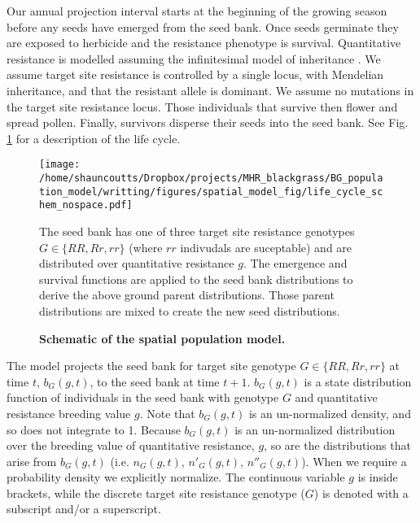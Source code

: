 \documentclass[10pt,letterpaper]{article}
\begin{document}
Our annual projection interval starts at the beginning of the growing season before any seeds have emerged from the seed bank. Once seeds germinate they are exposed to herbicide and the resistance phenotype is survival.  Quantitative resistance is modelled assuming the infinitesimal model of inheritance \cite{Fish1918}. We assume target site resistance is controlled by a single locus, with Mendelian inheritance, and that the resistant allele is dominant. We assume no mutations in the target site resistance locus. Those individuals that survive then flower and spread pollen. Finally, survivors disperse their seeds into the seed bank. See Fig. \ref{fig:schematic} for a description of the life cycle.  

\begin{figure}[!h]
	\centering
	\texttt{[image: /home/shauncoutts/Dropbox/projects/MHR\_blackgrass/BG\_population\_model/writting/figures/spatial\_model\_fig/life\_cycle\_schem\_nospace.pdf]}
\caption{\bf Schematic of the spatial population model.} The seed bank has one of three target site resistance genotypes $G \in \{RR, Rr, rr\}$ (where $rr$ indivudals are suceptable) and are distributed over quantitative resistance $g$. The emergence and survival functions are applied to the seed bank distributions to derive the above ground parent distributions. Those parent distributions are mixed to create the new seed distributions. \label{fig:schematic}
\end{figure}

The model projects the seed bank for target site genotype $G \in \{RR, Rr, rr\}$ at time $t$, $b_G(g, t)$, to the seed bank at time $t+1$. $b_G(g, t)$ is a state distribution function of individuals in the seed bank with genotype $G$ and quantitative resistance breeding value $g$. Note that $b_G(g, t)$ is an un-normalized density, and so does not integrate to 1. Because $b_G(g, t)$ is an un-normalized distribution over the breeding value of quantitative resistance, $g$, so are the distributions that arise from $b_G(g, t)$ (i.e. $n_G(g, t)$, $n'_G(g, t)$, $n''_G(g, t)$). When we require a probability density we explicitly normalize. The continuous variable $g$ is inside brackets, while the discrete target site resistance genotype ($G$) is denoted with a subscript and/or a superscript.    
\end{document}
